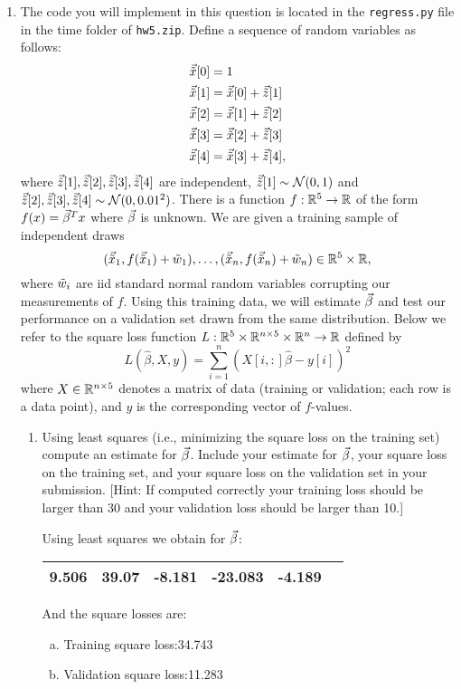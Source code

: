 \documentclass[12pt,twoside]{article}
\begin{document}
\begin{enumerate}
\item The code you will implement in this question is located in the
  \verb|regress.py| file in the time folder of  \verb|hw5.zip|.
  Define a sequence of random variables as follows:
  \begin{align*}
    \vec{\tilde{ x }} [0] &= 1\\
    \vec{\tilde{ x }}[1] &= \vec{\tilde{ x }}[0]+\vec{\tilde{ z }}[1]\\
    \vec{\tilde{ x }}[2] &= \vec{\tilde{ x }}[1]+\vec{\tilde{ z }}[2]\\
    \vec{\tilde{ x }}[3] &= \vec{\tilde{ x }}[2]+\vec{\tilde{ z }}[3]\\
    \vec{\tilde{ x }}[4] &= \vec{\tilde{ x }}[3]+\vec{\tilde{ z }}[4],
  \end{align*}
  where $\vec{\tilde{ z }}[1],\vec{\tilde{ z }}[2],\vec{\tilde{ z }}[3],\vec{\tilde{ z }}[4]$ are independent,
  $\vec{\tilde{ z }}[1]\sim\operatorname{\mathcal{N}}(0,1)$ and
  $\vec{\tilde{ z }}[2],\vec{\tilde{ z }}[3],\vec{\tilde{ z }}[4]\sim\operatorname{\mathcal{N}}(0,0.01^2)$.  There is a function
  $f:\mathbb{R}^5\to\mathbb{R}$ of the form $f(x)=\vec{\beta}^Tx$ where $\vec{\beta}$ is
  unknown.  We are given a training sample of independent draws
  $$(\vec{\tilde{ x }}_1,f(\vec{\tilde{ x }}_1)+\tilde{ w }_1),\ldots,(\vec{\tilde{ x }}_n,f(\vec{\tilde{ x }}_n)+\tilde{ w }_n)\in\mathbb{R}^5\times\mathbb{R},$$
  where $\tilde{ w }_i$ are iid standard normal random variables corrupting
  our measurements of $f$.
  Using this training data, we will estimate $\vec{\beta}$ and test our
  performance on a validation set drawn from the same distribution.
  Below we refer to the square loss function
  $L:\mathbb{R}^5\times\mathbb{R}^{n\times 5}\times\mathbb{R}^n\to\mathbb{R}$ defined by
  $$L(\hat{\beta},X,y) = \sum_{i=1}^n (X[i,:]\hat{\beta}-y[i])^2$$
  where $X\in\mathbb{R}^{n\times 5}$ denotes a matrix of data (training or validation; each row
  is a data point), and $y$ is the corresponding vector of $f$-values.
  \begin{enumerate}
  \item Using least squares (i.e., minimizing the square loss on the
    training set) compute an estimate for $\vec{\beta}$.  Include your
    estimate for $\vec{\beta}$, your square loss on the training set, and
    your square loss on the validation set in your submission.
    [Hint: If computed correctly your training loss should be larger
      than 30 and your validation loss should be larger than 10.]
      
   Using least squares we obtain for $\vec{\beta}$:
   \begin{center}
    		\begin{tabular}{ | c | c | c | c | c | c | }
		\hline
			9.506 & 39.07 & -8.181 & -23.083 &  -4.189\\ 
		\hline
    	\end{tabular}
    \end{center}
    And the square losses are:
    \begin{enumerate}[(a)]
	\item Training square loss:34.743
	\item Validation square loss:11.283
    \end{enumerate}


\end{enumerate}
\end{enumerate}
\end{document}
